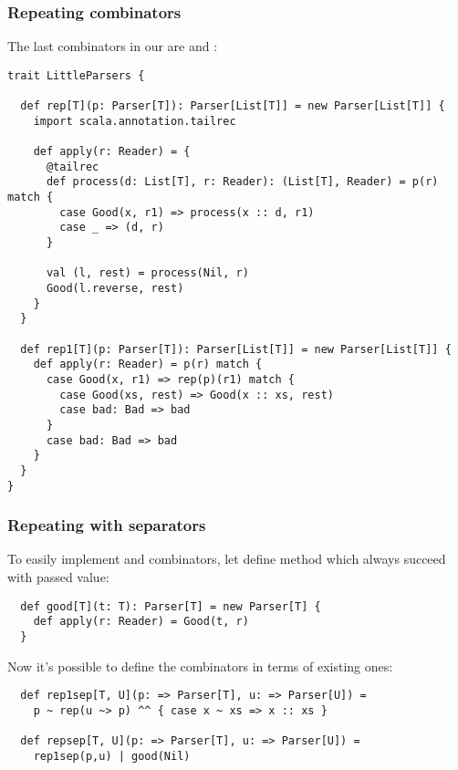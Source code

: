 \documentclass[t]{beamer}
\begin{document}
\begin{frame}[fragile]
\frametitle{Repeating combinators}
The last combinators in our  are  and :
\begin{lstlisting}
trait LittleParsers {

  def rep[T](p: Parser[T]): Parser[List[T]] = new Parser[List[T]] {
    import scala.annotation.tailrec

    def apply(r: Reader) = {
      @tailrec
      def process(d: List[T], r: Reader): (List[T], Reader) = p(r) match {
        case Good(x, r1) => process(x :: d, r1)
        case _ => (d, r)
      }

      val (l, rest) = process(Nil, r)
      Good(l.reverse, rest)
    }
  }

  def rep1[T](p: Parser[T]): Parser[List[T]] = new Parser[List[T]] {
    def apply(r: Reader) = p(r) match {
      case Good(x, r1) => rep(p)(r1) match {
        case Good(xs, rest) => Good(x :: xs, rest)
        case bad: Bad => bad
      }
      case bad: Bad => bad
    }
  }
}
\end{lstlisting}
\end{frame}

\begin{frame}[fragile]
\frametitle{Repeating with separators}
To easily implement  and  combinators, let define
method  which always succeed with passed value:

\begin{lstlisting}
  def good[T](t: T): Parser[T] = new Parser[T] {
    def apply(r: Reader) = Good(t, r)
  }
\end{lstlisting}

Now it's possible to define the combinators in terms of existing ones:

\begin{lstlisting}
  def rep1sep[T, U](p: => Parser[T], u: => Parser[U]) =
    p ~ rep(u ~> p) ^^ { case x ~ xs => x :: xs }

  def repsep[T, U](p: => Parser[T], u: => Parser[U]) =
    rep1sep(p,u) | good(Nil)
\end{lstlisting}
\end{frame}
\end{document}
